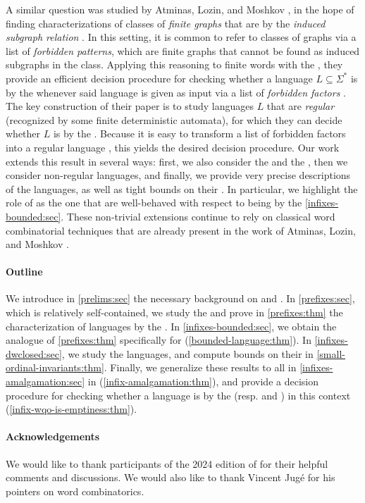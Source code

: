 A similar question was studied by Atminas, Lozin, and Moshkov \cite{ALM17}, in
the hope of finding characterizations of classes of \emph{finite graphs} that
are  by the \emph{induced subgraph relation}
\cite[Section 7]{ALM17}. In this setting, it is common to refer to classes of
graphs via a list of \emph{forbidden patterns}, which are finite graphs that
cannot be found as induced subgraphs in the class. Applying this reasoning to
finite words with the , they provide an efficient decision
procedure for checking whether a language $L \subseteq \Sigma^*$ is
 by the  whenever said language is
given as input via a list of \emph{forbidden factors} \cite[Theorem 1, Theorem
2]{ALM17}. The key construction of their paper is to study languages $L$ that
are \emph{regular} (recognized by some finite deterministic automata), for
which they can decide whether $L$ is  by the  \cite[Theorem 1]{ALM17}. Because it is easy to transform a list of
forbidden factors into a regular language \cite[Theorem 1]{ALM17}, this yields
the desired decision procedure. Our work extends this result in several ways:
first, we also consider the  and the ,
then we consider non-regular languages, and finally, we provide very precise
descriptions of the  languages, as well as tight bounds
on their . In particular, we highlight the role of
 as the one that are well-behaved with respect to being
 by the  \cref{infixes-bounded:sec}.
These non-trivial extensions continue to rely
on classical word combinatorial techniques that are already present in the work
of Atminas, Lozin, and Moshkov \cite[Section 3]{ALM17}.

\paragraph*{Outline} 
We introduce in \cref{prelims:sec} the
necessary background on  and .
In
\cref{prefixes:sec}, which is relatively
self-contained, we study the  and prove in
\cref{prefixes:thm} the characterization of 
languages by the . In
\cref{infixes-bounded:sec}, we
obtain the  analogue of \cref{prefixes:thm}
specifically for 
(\cref{bounded-language:thm}). 
In \cref{infixes-dwclosed:sec}, we study the 
languages, and compute bounds on their  in \cref{small-ordinal-invariants:thm}.
Finally, 
we generalize these results to all
 in \cref{infixes-amalgamation:sec}
in
(\cref{infix-amalgamation:thm}),
and provide a decision procedure for checking whether a language is
 by the  (resp.  and ) in
this context (\cref{infix-wqo-is-emptiness:thm}).

\paragraph*{Acknowledgements} We would like to thank participants of the 2024
edition of  for their helpful comments and discussions.
We would also like to thank Vincent Jugé for his pointers on word combinatorics.
